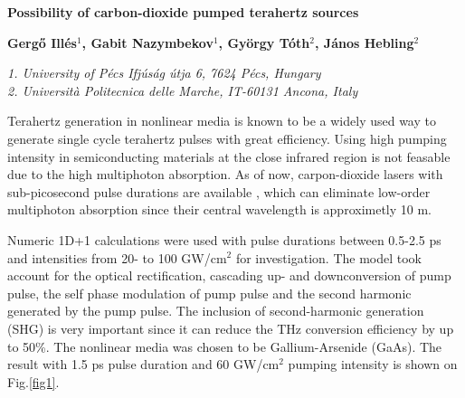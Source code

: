 \documentclass{article}
\begin{document}
\begin{center}
{\Large\bfseries
Possibility of carbon\hyp{}dioxide pumped terahertz sources\par}
\vspace{3ex}
{\bfseries
Gergő Illés$^{1}$, Gabit Nazymbekov$^{1}$, György Tóth$^{2}$, János Hebling$^{2}$\par}
{\footnotesize\itshape
1. University of Pécs Ifjúság útja 6, 7624 Pécs, Hungary\\
2. Universit\`a Politecnica delle Marche, IT-60131 Ancona, Italy\par}
\vspace{3ex}
\end{center}
Terahertz generation in nonlinear media is known to be a widely used way to generate single cycle terahertz pulses with great efficiency. Using high pumping intensity in semiconducting materials at the close infrared region is not feasable due to the high multiphoton absorption. \cite{polonyi2016high} As of now, carpon\hyp{}dioxide lasers with sub-picosecond pulse durations are available \cite{polyanskiy2020demonstration}, which can eliminate low-order multiphoton absorption since their central wavelength is approximetly 10 \textmu m.

Numeric 1D+1 calculations were used with pulse durations between 0.5\hyp{}2.5 ps and intensities from 20\hyp{} to 100 GW/cm$^2$ for investigation. The model took account for the optical rectification, cascading up\hyp{} and downconversion of pump pulse, the self phase modulation of pump pulse \cite{ravi2014limitations} and the second harmonic generated by the pump pulse. The inclusion of second-harmonic generation (SHG) is very important since it can reduce the THz conversion efficiency by up to 50\%. The nonlinear media was chosen to be Gallium-Arsenide (GaAs). The result with 1.5 ps pulse duration and 60 GW/cm$^2$ pumping intensity is shown on {Fig.\ref{fig1}}.

\end{document}
